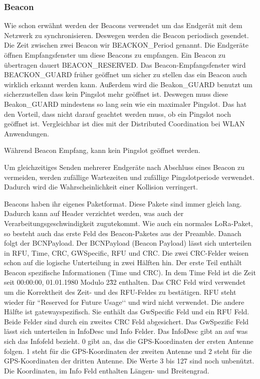 \documentclass[a4paper, 12pt]{article}
\begin{document}
            \subsubsection{Beacon}
                Wie schon erwähnt werden der Beacons verwendet um das Endgerät mit dem Netzwerk zu synchronisieren. 
                Deswegen werden die Beacon periodisch gesendet. Die Zeit zwischen zwei Beacon wir BEACKON\_Period 
                genannt. Die Endgeräte öffnen Empfangsfenster um diese Beacons zu empfangen. Ein Beacon zu übertragen 
                dauert BEACON\_RESERVED. Das Beacon-Empfangsfenster wird BEACKON\_GUARD früher geöffnet um 
                sicher zu stellen das ein Beacon auch wirklich erkannt werden kann. Außerdem wird die Beakon\_GUARD 
                benutzt um sicherzustellen dass kein Pingslot mehr geöffnet ist. Deswegen muss diese Beakon\_GUARD 
                mindestens so lang sein wie ein maximaler Pingslot. Das hat den Vorteil, dass nicht darauf geachtet
                werden muss, ob ein Pingslot noch geöffnet ist. Vergleichbar ist dies mit der Distributed Coordination 
                bei WLAN Anwendungen.

                Während Beacon Empfang, kann kein Pingslot geöffnet werden.
                
                Um gleichzeitiges Senden mehrerer Endgeräte nach Abschluss eines Beacon zu vermeiden,
                werden zufällige Wartezeiten und zufällige Pingslotperiode verwendet. Dadurch wird die Wahrscheinlichkeit 
                einer Kollision verringert.

                Beacons haben ihr eigenes Paketformat. Diese Pakete sind immer gleich lang. Dadurch kann auf Header 
                verzichtet werden, was auch der Verarbeitungsgeschwindigkeit zugutekommt. Wie auch ein normales 
                LoRa-Paket, so besteht auch das erste Feld des Beacon-Paketes aus der Preamble. Danach folgt der 
                BCNPayload. Der BCNPayload (Beacon Payload) lässt sich unterteilen in RFU, Time, CRC, GWSpecific, 
                RFU und CRC. Die zwei CRC-Felder weisen schon auf die logische Unterteilung in zwei Hälften hin. Der 
                erste Teil enthält Beacon spezifische Informationen (Time und CRC). In dem Time Feld ist die Zeit 
                seit 00:00:00, 01.01.1980 Modulo 2\^32 enthalten. Das CRC Feld wird verwendet um die Korrektheit des 
                Zeit- und des RFU-Feldes zu bestätigen. RFU steht wieder für ``Reserved for Future Usage‘‘ und wird 
                nicht verwendet. Die andere Hälfte ist gatewayspezifisch. Sie enthält das GwSpecific Feld und ein 
                RFU Feld. Beide Felder sind durch ein zweites CRC Feld abgesichert. Das GwSpezific Feld lässt 
                sich unterteilen in InfoDesc und Info Felder. Das InfoDesc gibt an auf was sich das Infofeld bezieht. 
                0 gibt an, das die GPS-Koordinaten der ersten Antenne folgen. 1 steht für die GPS-Koordinaten der 
                zweiten Antenne und 2 steht für die GPS-Koordinaten der dritten Antenne. Die Werte 3 bis 127 sind noch unbenützt.
                Die Koordinaten, im Info Feld enthalten Längen- und Breitengrad.
                
\end{document}

